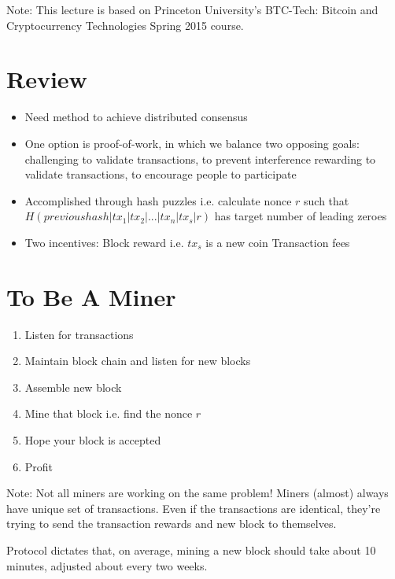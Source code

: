 \documentclass{article}
\begin{document}
\maketitle

Note: This lecture is based on Princeton University's BTC-Tech: Bitcoin and Cryptocurrency Technologies Spring 2015 course.

\section*{Review}
\begin{itemize}
\item Need method to achieve distributed consensus
\item One option is proof-of-work, in which we balance two opposing goals:
\subitem challenging to validate transactions, to prevent interference
\subitem rewarding to validate transactions, to encourage people to participate
\item Accomplished through hash puzzles i.e. calculate nonce $r$ such that $H(previous hash | tx_1 | tx_2 | ... | tx_n | tx_s | r)$ has target number of leading zeroes
\item Two incentives:
\subitem Block reward i.e. $tx_s$ is a new coin
\subitem Transaction fees
\end{itemize}

\section*{To Be A Miner}
\begin{enumerate}
\item Listen for transactions
\item Maintain block chain and listen for new blocks
\item Assemble new block
\item Mine that block i.e. find the nonce $r$
\item Hope your block is accepted
\item Profit
\end{enumerate}

Note: Not all miners are working on the same problem! Miners (almost) always have unique set of transactions. Even if the transactions are identical, they're trying to send the transaction rewards and new block to themselves.

Protocol dictates that, on average, mining a new block should take about 10 minutes, adjusted about every two weeks.
\end{document}
